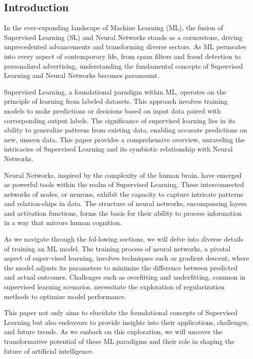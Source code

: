 \documentclass[12pt, twoside]{article}
\begin{document}
\begin{multicols*}{2}
	
\section{Introduction}
In the ever-expanding landscape of Machine Learning (ML), the fusion of Supervised Learning (SL) and Neural Networks stands as a cornerstone, driving unprecedented advancements and transforming diverse sectors. As ML permeates into every aspect of contemporary life, from spam filters and fraud detection to personalized advertising, understanding the fundamental concepts of Supervised Learning and Neural Networks becomes paramount.

Supervised Learning, a foundational paradigm within ML, operates on the principle of learning from labeled datasets. This approach involves training models to make predictions or decisions based on input data paired with corresponding output labels. The significance of supervised learning lies in its ability to generalize patterns from existing data, enabling accurate predictions on new, unseen data. This paper provides a comprehensive overview, unraveling the intricacies of Supervised Learning and its symbiotic relationship with Neural Networks.

Neural Networks, inspired by the complexity of the human brain, have emerged as powerful tools within the realm of Supervised Learning. These interconnected networks of nodes, or neurons, exhibit the capacity to capture intricate patterns and relation-ships in data. The structure of neural networks, encompassing layers and activation functions, forms the basis for their ability to process information in a way that mirrors human cognition.

As we navigate through the fol-lowing sections, we will delve into diverse details of training an ML model. The training process of neural networks, a pivotal aspect of super-vised learning, involves techniques such as gradient descent, where the model adjusts its parameters to minimize the difference between predicted and actual outcomes. Challenges such as overfitting and underfitting, common in supervised learning scenarios, necessitate the exploration of regularization methods to optimize model performance.

This paper not only aims to elucidate the foundational concepts of Supervised Learning but also endeavors to provide insights into their applications, challenges, and future trends. As we embark on this exploration, we will uncover the transformative potential of these ML paradigms and their role in shaping the future of artificial intelligence.
	

\end{multicols*}
\end{document}
